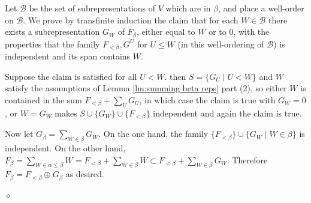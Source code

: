 \documentclass{article}
\newenvironment{proof}{\vspace*{2ex}\noindent {\em Proof:}
}{\hfill $\diamond$ \\[2ex]}
\newcommand{\hilight}[1]{\colorbox{yellow}{#1}}
\begin{document}
\begin{proof}

Let $\mathcal{B}$ be the set of subrepresentations of $V$ which are in $\beta$, and place a well-order on $\mathcal{B}$. We prove by transfinite induction the claim that for each $W \in \mathcal{B}$ there exists a subrepresentation $G_{W}$ of $F_\beta$, either equal to $W$ or to $0$, with the properties that the family $F_{< \beta}, G^U$ for $U \leq W$ (in this well-ordering of  $\mathcal{B}$) is independent and its span contains $W$. 

Suppose the claim is satisfied for all $U < W$. then $S=\{G_U \mid U<W\}$ and $W$ satisfy the assumptions of Lemma \ref{lm:summing beta reps} part (2), so either $W$ is contained in the sum $F_{<\beta} + \sum_U G_U$, in which case the claim is true with $G_W=0$, or $W=G_W$ makes $S \cup \{G_W\} \cup \{F_{<\beta}\}$ independent and again the claim is true.  

Now let $G_\beta = \sum_{W \in \beta} G_W$. On the one hand, the family $\{F_{< \beta}\} \cup \{ G_W \mid W \in \beta\}$ is independent. On the other hand, $F_\beta = \sum_{W \in \alpha \leq \beta} W = F_{<\beta} + \sum_{ W \in \beta} W \subset F_{<\beta} + \sum_{ W \in \beta} G_W$.  Therefore $F_\beta = F_{<\beta} \oplus G_\beta$ as desired. 













\end{proof}
\end{document}
